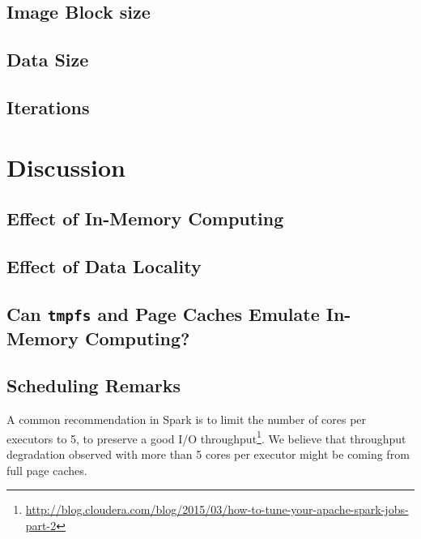 \documentclass{IEEEtran}
\begin{document}
\subsection{Image Block size}

\subsection{Data Size}

\subsection{Iterations}


\section{Discussion} %
\label{sec:discussion}
\subsection{Effect of In-Memory Computing}

\subsection{Effect of Data Locality}


\subsection{Can \texttt{tmpfs} and Page Caches Emulate In-Memory Computing?}


\subsection{Scheduling Remarks}


A common recommendation in Spark is to limit the number of cores per 
executors to 5, to preserve a good I/O 
throughput\footnote{\url{http://blog.cloudera.com/blog/2015/03/how-to-tune-your-apache-spark-jobs-part-2}}. 
We believe that throughput degradation observed with more than 5 cores 
per executor might be coming from full page caches.
\end{document}
